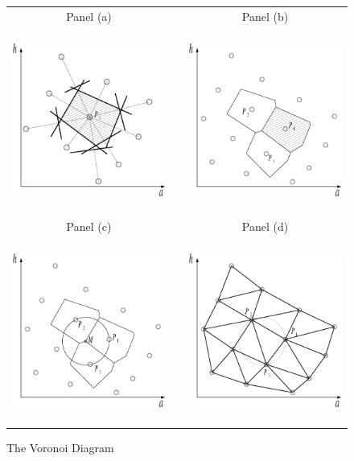 \documentclass[a4paper,12pt]{article}
\begin{document}
\begin{figure}[htb] 
	\caption{The Voronoi Diagram}
	\label{Delaunay Triangulation}
	\centering
	\begin{tabular}{cC{1cm}c}
	Panel (a) & & Panel (b)  \\
	\includegraphics[height=6.0cm, width=6.0cm]{Abbildungen/Voronoi_1_shape.eps} & & \includegraphics[height=6.0cm, width=6.0cm]{Abbildungen/Voronoi_2_shape.eps} \\
	Panel (c) & & Panel (d)  \\
	\includegraphics[height=6.0cm, width=6.0cm]{Abbildungen/Voronoi_3.eps} & & \includegraphics[height=6.0cm, width=6.0cm]{Abbildungen/Delaunay_!.eps} \\

\end{tabular}
\end{figure}
\end{document}
